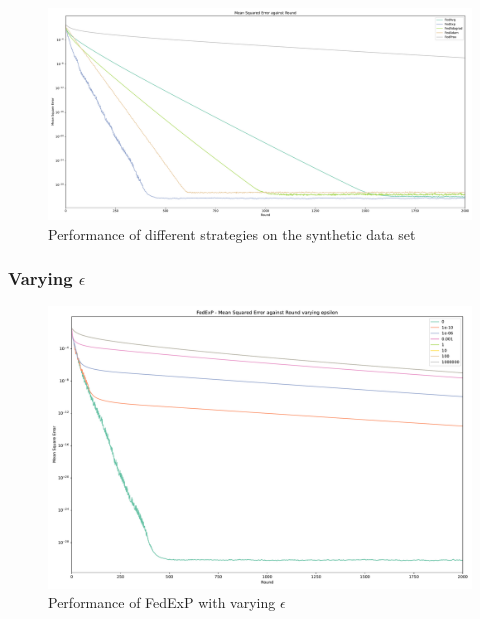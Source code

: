 \documentclass{article}
\begin{document}
\begin{figure}
    \centerline{\includegraphics[width=\linewidth]{figs/synthetic_2000Rounds.pdf}}
    \caption{Performance of different strategies on the synthetic data set}
    \label{fig:2000RoundsSynthetic}
\end{figure}

\subsubsection{Varying $\epsilon$}

\begin{figure}
    \centerline{\includegraphics[width=.6\linewidth]{figs/synthetic_varyingEpsilon.pdf}}
    \caption{Performance of FedExP with varying $\epsilon$}
    \label{fig:varyingEpsilon}
\end{figure}
\end{document}
